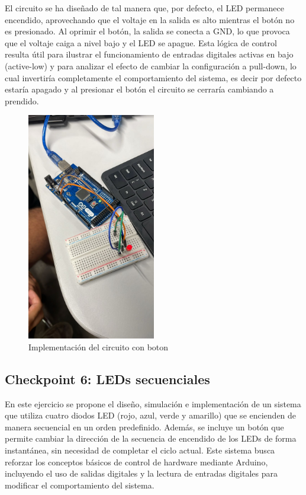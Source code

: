 \documentclass{article}
\begin{document}
El circuito se ha diseñado de tal manera que, por defecto, el LED permanece encendido, aprovechando que el voltaje en la salida es alto mientras el botón no es presionado. Al oprimir el botón, la salida se conecta a GND, lo que provoca que el voltaje caiga a nivel bajo y el LED se apague. Esta lógica de control resulta útil para ilustrar el funcionamiento de entradas digitales activas en bajo (active-low) y para analizar el efecto de cambiar la configuración a pull-down, lo cual invertiría completamente el comportamiento del sistema, es decir por defecto estaría apagado y al presionar el botón el circuito se cerraría cambiando a prendido.

\begin{figure}[H]
    \centering
    \includegraphics[width=0.50\textwidth]{./img/chkp-3-5-1.jpeg}
    \caption{Implementación del circuito con boton}
    \label{fig:simulacion_esquema8}
\end{figure}

\subsection{Checkpoint 6: LEDs secuenciales}

En este ejercicio se propone el dise\~no, simulación e implementación de un sistema que utiliza cuatro diodos LED (rojo, azul, verde y amarillo) que se encienden de manera secuencial en un orden predefinido. Adem\'as, se incluye un botón que permite cambiar la dirección de la secuencia de encendido de los LEDs de forma instant\'anea, sin necesidad de completar el ciclo actual. Este sistema busca reforzar los conceptos b\'asicos de control de hardware mediante Arduino, incluyendo el uso de salidas digitales y la lectura de entradas digitales para modificar el comportamiento del sistema.
\end{document}
